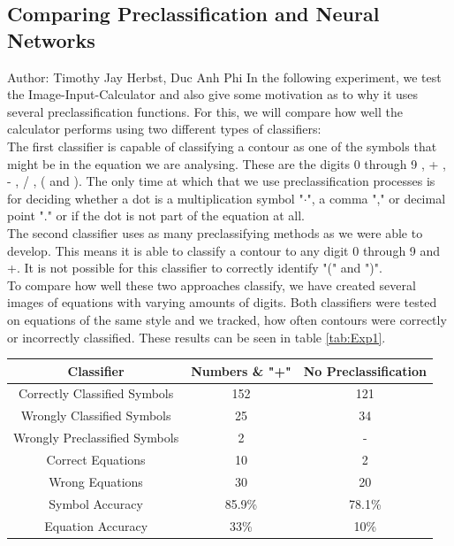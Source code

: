 \documentclass[11pt]{article}
\begin{document}
	\subsection{Comparing Preclassification and Neural Networks}
	\small{Author: Timothy Jay Herbst, Duc Anh Phi} \newline \newline
	In the following experiment, we test the Image-Input-Calculator and also give some motivation as to why it uses several preclassification functions.
	For this, we will compare how well the calculator performs using two different types of classifiers:\\
	The first classifier is capable of classifying a contour as one of the symbols that might be in the equation we are analysing.
	These are the digits 0 through 9 , + , - , / , ( and ).
	The only time at which that we use preclassification processes is for deciding whether a dot is a multiplication symbol "$\cdot$", a comma "," or decimal point "." or if the dot is not part of the equation at all.\\
	The second classifier uses as many preclassifying methods as we were able to develop.
	This means it is able to classify a contour to any digit 0 through 9 and +.
	It is not possible for this classifier to correctly identify "(" and ")".\\ %
	To compare how well these two approaches classify, we have created several images of equations with varying amounts of digits.
	Both classifiers were tested on equations of the same style and we tracked, how often contours were correctly or incorrectly classified.
	These results can be seen in table \ref{tab:Exp1}.
	
	
	
	\begin{center}
		\begin{tabular}{|c|| c | c|} 
			\hline
			 Classifier & Numbers \& "+" & No Preclassification \\
			\hline\hline
			Correctly Classified Symbols & 152 & 121 \\ 
			\hline
			Wrongly Classified Symbols& 25 & 34\\
			\hline
			Wrongly Preclassified Symbols & 2 & - \\
			\hline
			Correct Equations & 10 & 2\\
			\hline
			Wrong Equations & 30 & 20\\
			\hline
			Symbol Accuracy & 85.9\% & 78.1\% \\
			\hline
			Equation Accuracy & 33\% & 10\% \\
			\hline
		\end{tabular}\label{tab:Exp1}
	\end{center}
	
\end{document}
